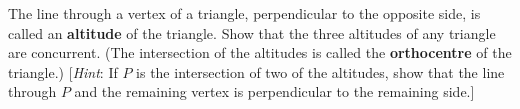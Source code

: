 \begin{multicols}{2}
\columnbreak 

\begin{supex}
The line through a vertex of a triangle, perpendicular to the opposite side, is called an \textbf{altitude} of the triangle. Show that the three altitudes of any triangle are 
concurrent. (The intersection of the altitudes is called the \textbf{orthocentre} of the triangle.) [\textit{Hint}: If $P$ is the intersection of two of the altitudes, show that the line through $P$ and the remaining vertex is perpendicular to the remaining side.]

\end{supex}
\end{multicols}
